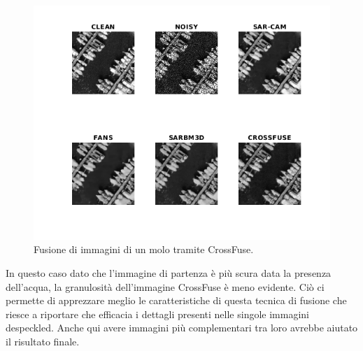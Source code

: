 \begin{figure}[H] 
  \centering
  \includegraphics[width=1.0\textwidth]{utils/CFharbor03.png}
  \caption{Fusione di immagini di un molo tramite CrossFuse.}
  \label{fig:harbor03CF}
\end{figure}
In questo caso dato che l'immagine di partenza è più scura data la presenza dell'acqua, la granulosità dell'immagine CrossFuse è meno evidente.
Ciò ci permette di apprezzare meglio le caratteristiche di questa tecnica di fusione che riesce a riportare che efficacia i dettagli presenti 
nelle singole immagini despeckled. Anche qui avere immagini più complementari tra loro avrebbe aiutato il risultato finale. 

